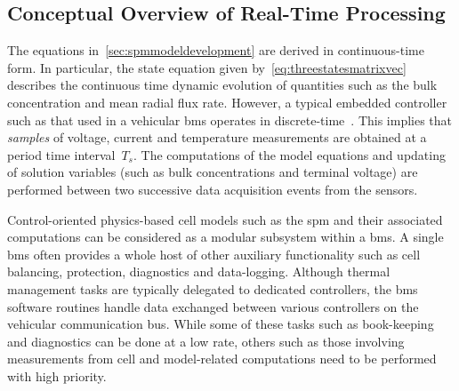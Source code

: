 \subsection{Conceptual Overview of Real-Time Processing}

The equations  in~\cref{sec:spmmodeldevelopment} are derived  in continuous-time
form. In particular, the  state equation given by~\cref{eq:threestatesmatrixvec}
describes  the  continuous   time  dynamic  evolution  of   quantities  such  as
the  bulk  concentration   and  mean  radial  flux  rate.   However,  a  typical
embedded  controller  such  as  that  used in  a  vehicular  \gls{bms}  operates
in   discrete-time~\cite{Andrea2010}.  This   implies  that   \emph{samples}  of
voltage,  current and  temperature measurements  are obtained  at a  period time
interval~$T_s$. The computations of the model equations and updating of solution
variables  (such as  bulk  concentrations and  terminal  voltage) are  performed
between two successive data acquisition events from the sensors.


Control-oriented  physics-based cell  models  such as  the  \gls{spm} and  their
associated  computations can  be  considered  as a  modular  subsystem within  a
\gls{bms}. A  single \gls{bms} often  provides a  whole host of  other auxiliary
functionality such as cell  balancing, protection, diagnostics and data-logging.
Although  thermal   management  tasks  are  typically   delegated  to  dedicated
controllers,  the  \gls{bms} software  routines  handle  data exchanged  between
various  controllers on  the vehicular  communication bus.  While some  of these
tasks such  as book-keeping and  diagnostics can be done  at a low  rate, others
such as  those involving measurements  from cell and  model-related computations
need to be performed with high priority.


